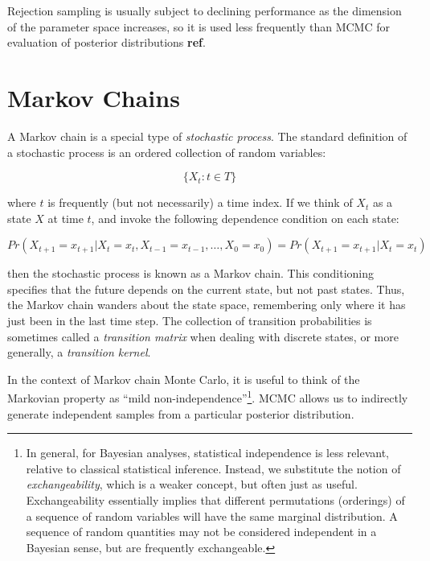 Rejection sampling is usually subject to declining performance as the dimension of the parameter space increases, so it is used less frequently than MCMC for evaluation of posterior distributions \textbf{ref}.


\hypertarget{markov-chains}{}
\section*{Markov Chains}

A Markov chain is a special type of \emph{stochastic process}. The standard definition of a stochastic process is an ordered collection of random variables:

\[
\{X_t:t \in T\}
\]

\noindent where $t$ is frequently (but not necessarily) a time index. If we think of $X_t$ as a state $X$ at time $t$, and invoke the following dependence condition on each state:

\[
Pr(X_{t+1}=x_{t+1} | X_t=x_t, X_{t-1}=x_{t-1},\ldots,X_0=x_0) = Pr(X_{t+1}=x_{t+1} | X_t=x_t)
\]

\noindent then the stochastic process is known as a Markov chain. This conditioning specifies that the future depends on the current state, but not past states. Thus, the Markov chain wanders about the state space, remembering only where it has just been in the last time step. The collection of transition probabilities is sometimes called a \emph{transition matrix} when dealing with discrete states, or more generally, a \emph{transition kernel}. 

\noindent In the context of Markov chain Monte Carlo, it is useful to think of the Markovian property as ``mild non-independence''\footnote{In general, for Bayesian analyses, statistical independence is less relevant, relative to classical statistical inference. Instead, we substitute the notion of \emph{exchangeability}, which is a weaker concept, but often just as useful. Exchangeability essentially implies that different permutations (orderings) of a sequence of random variables will have the same marginal distribution. A sequence of random quantities may not be considered independent in a Bayesian sense, but are frequently exchangeable.}. MCMC allows us to indirectly generate independent samples from a particular posterior distribution.


